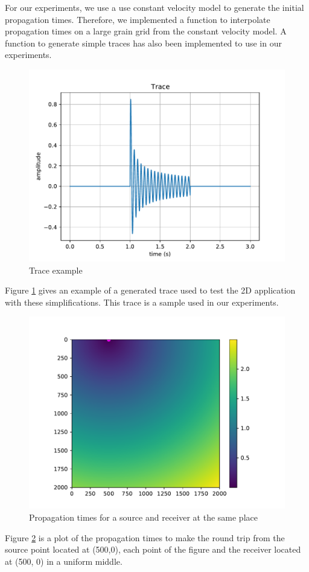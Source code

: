 For our experiments, we use a use constant velocity model to generate the initial propagation times.
Therefore, we implemented a function to interpolate propagation times on a large grain grid from the constant velocity model.
A function to generate simple traces has also been implemented to use in our experiments.

\begin{figure}[h]
	\centering
	\includegraphics[width=.7\textwidth]{trace.pdf}
	\caption{Trace example\label{fig:kirchhoff_trace}}
\end{figure}

Figure \ref{fig:kirchhoff_trace} gives an example of a generated trace used to test the 2D application with these simplifications.
This trace is a sample used in our experiments.

\begin{figure}[H]
	\centering
	\includegraphics[width=.7\textwidth]{traceppt.pdf}
	\caption{Propagation times for a source and receiver at the same place\label{fig:kirchhoff_pt}}
\end{figure}

Figure \ref{fig:kirchhoff_pt} is a plot of the propagation times to make the round trip from the source point located at (500,0), each point of the figure and the receiver located at (500, 0) in a uniform middle.

